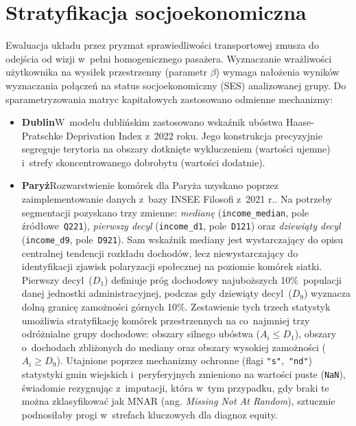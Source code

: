 \documentclass{pracamgr}
\begin{document}
\clearpage 

\section{Stratyfikacja socjoekonomiczna}

Ewaluacja układu przez pryzmat sprawiedliwości transportowej zmusza do odejścia od wizji w~pełni homogenicznego pasażera. Wyznaczanie wrażliwości użytkownika na wysiłek przestrzenny (parametr $\beta$) wymaga nałożenia wyników wyznaczania połączeń na status socjoekonomiczny (SES) analizowanej grupy. Do sparametryzowania matryc kapitałowych zastosowano odmienne mechanizmy:

\begin{itemize}
\item[]\textbf{Dublin}\newline W~modelu dublińskim zastosowano wskaźnik ubóstwa Haase-Pratschke Deprivation Index z~2022 roku. Jego konstrukcja precyzyjnie segreguje terytoria na obszary dotknięte wykluczeniem (wartości ujemne) i~strefy skoncentrowanego dobrobytu (wartości dodatnie).
\item[]\textbf{Paryż}\newline Rozwarstwienie komórek dla Paryża uzyskano poprzez zaimplementowanie danych z~bazy INSEE Filosofi z~2021 r.. Na potrzeby segmentacji pozyskano trzy zmienne: \textit{medianę} (\texttt{income\_median}, pole źródłowe~\texttt{Q221}), \textit{pierwszy decyl} (\texttt{income\_d1}, pole~\texttt{D121}) oraz \textit{dziewiąty decyl} (\texttt{income\_d9}, pole~\texttt{D921}). Sam wskaźnik mediany jest wystarczający do opisu centralnej tendencji rozkładu dochodów, lecz niewystarczający do identyfikacji zjawisk polaryzacji społecznej na poziomie komórek siatki. Pierwszy decyl~($D_1$) definiuje próg dochodowy najuboższych 10\%~populacji danej jednostki administracyjnej, podczas gdy dziewiąty decyl~($D_9$) wyznacza dolną granicę zamożności górnych 10\%. Zestawienie tych trzech statystyk umożliwia stratyfikację komórek przestrzennych na co~najmniej trzy odróżnialne grupy dochodowe: obszary silnego ubóstwa ($A_i \leq D_1$), obszary o~dochodach zbliżonych do mediany oraz obszary wysokiej zamożności ($A_i \geq D_9$). Utajnione poprzez mechanizmy ochronne (flagi \texttt{"s"},~\texttt{"nd"}) statystyki gmin wiejskich i~peryferyjnych zmieniono na wartości puste (\texttt{NaN}), świadomie rezygnując z~imputacji, która w~tym przypadku, gdy braki te można zklasyfikować jak MNAR (ang. \textit{Missing Not At Random}), sztucznie podnosiłaby progi w~strefach kluczowych dla diagnoz equity.

\end{itemize}
\end{document}
